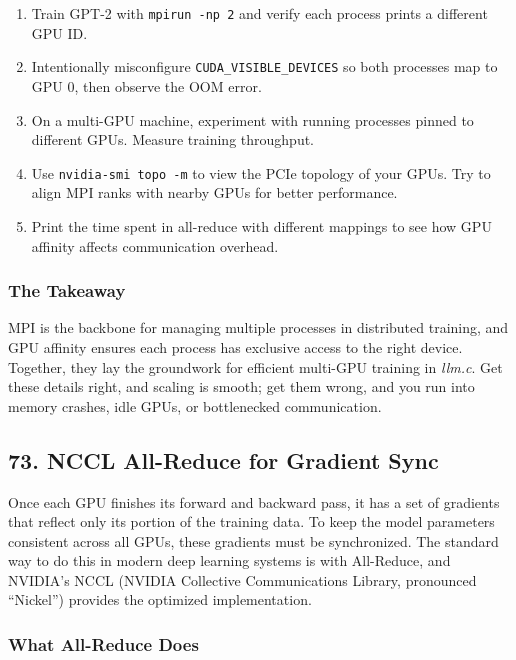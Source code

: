 \documentclass[
  letterpaper,
  DIV=11,
  numbers=noendperiod]{scrreprt}
\providecommand{\tightlist}{%
  \setlength{\itemsep}{0pt}\setlength{\parskip}{0pt}}
\begin{document}
\begin{enumerate}
\def\labelenumi{\arabic{enumi}.}
\tightlist
\item
  Train GPT-2 with \texttt{mpirun\ -np\ 2} and verify each process
  prints a different GPU ID.
\item
  Intentionally misconfigure \texttt{CUDA\_VISIBLE\_DEVICES} so both
  processes map to GPU 0, then observe the OOM error.
\item
  On a multi-GPU machine, experiment with running processes pinned to
  different GPUs. Measure training throughput.
\item
  Use \texttt{nvidia-smi\ topo\ -m} to view the PCIe topology of your
  GPUs. Try to align MPI ranks with nearby GPUs for better performance.
\item
  Print the time spent in all-reduce with different mappings to see how
  GPU affinity affects communication overhead.
\end{enumerate}

\subsubsection{The Takeaway}\label{the-takeaway-61}

MPI is the backbone for managing multiple processes in distributed
training, and GPU affinity ensures each process has exclusive access to
the right device. Together, they lay the groundwork for efficient
multi-GPU training in \emph{llm.c}. Get these details right, and scaling
is smooth; get them wrong, and you run into memory crashes, idle GPUs,
or bottlenecked communication.

\subsection{73. NCCL All-Reduce for Gradient
Sync}\label{nccl-all-reduce-for-gradient-sync}

Once each GPU finishes its forward and backward pass, it has a set of
gradients that reflect only its portion of the training data. To keep
the model parameters consistent across all GPUs, these gradients must be
synchronized. The standard way to do this in modern deep learning
systems is with All-Reduce, and NVIDIA's NCCL (NVIDIA Collective
Communications Library, pronounced ``Nickel'') provides the optimized
implementation.

\subsubsection{What All-Reduce Does}\label{what-all-reduce-does}
\end{document}
